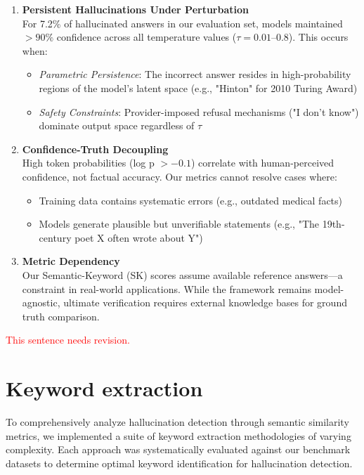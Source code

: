 \documentclass[sigconf]{acmart}
\newcommand{\collab}[1]{\textcolor{red}{#1}}
\begin{document}
\begin{enumerate}
    \item \textbf{Persistent Hallucinations Under Perturbation}\\
    For 7.2\% of hallucinated answers in our evaluation set, models maintained $>90\%$ confidence across all temperature values ($\tau = 0.01$--$0.8$). This occurs when:
    \begin{itemize}
        \item \textit{Parametric Persistence}: The incorrect answer resides in high-probability regions of the model's latent space (e.g., "Hinton" for 2010 Turing Award)
        \item \textit{Safety Constraints}: Provider-imposed refusal mechanisms ("I don't know") dominate output space regardless of $\tau$
    \end{itemize}
    
    \item \textbf{Confidence-Truth Decoupling}\\
    High token probabilities (log p $> -0.1$) correlate with human-perceived confidence, not factual accuracy. Our metrics cannot resolve cases where:
    \begin{itemize}
        \item Training data contains systematic errors (e.g., outdated medical facts)
        \item Models generate plausible but unverifiable statements (e.g., "The 19th-century poet X often wrote about Y")
    \end{itemize}
    
    \item \textbf{Metric Dependency}\\
    Our Semantic-Keyword (SK) scores assume available reference answers—a constraint in real-world applications. While the framework remains model-agnostic, ultimate verification requires external knowledge bases for ground truth comparison.
\end{enumerate}

\collab{This sentence needs revision.}





\section{Keyword extraction}
\label{sec:keyword_extraction}
To comprehensively analyze hallucination detection through semantic similarity metrics, we implemented a suite of keyword extraction methodologies of varying complexity. Each approach was systematically evaluated against our benchmark datasets to determine optimal keyword identification for hallucination detection.
\end{document}
